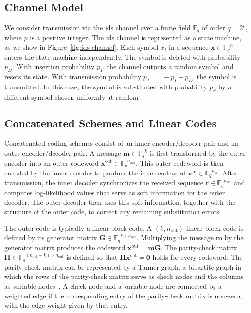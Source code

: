 \documentclass[conference,letterpaperu]{IEEEtran}
\newcommand{\pdel}{\ensuremath{p_D}}
\newcommand{\pins}{\ensuremath{p_I}}
\newcommand{\psub}{\ensuremath{p_S}}
\newcommand{\ptrans}{\ensuremath{p_T}}
\newcommand{\ygen}{\ensuremath{\bm{x}}}
\newcommand{\ygenIx}{\ensuremath{x}}
\newcommand{\yin}{\ensuremath{\bm{x}^{\text{in}}}}
\newcommand{\yout}{\ensuremath{\bm{x}^{\text{out}}}}
\newcommand{\mess}{\ensuremath{\bm{m}}}
\newcommand{\ngen}{\ensuremath{n}}
\newcommand{\nin}{\ensuremath{n_{\text{in}}}}
\newcommand{\nout}{\ensuremath{n_{\text{out}}}}
\newcommand{\rec}{\ensuremath{\bm{r}}}
\newcommand{\nrec}{\ensuremath{n_{\text{rec}}}}
\newcommand{\gen}{\ensuremath{\bm{G}}}
\newcommand{\pc}{\ensuremath{\bm{H}}}
\newcommand{\alphabet}{\ensuremath{\mathbb{F}_q}}
\begin{document}
\subsection{Channel Model}
We consider transmission via the \acl{ids} channel over a finite field $\alphabet$ of order $q = 2^p$, where $p$ is a positive integer. 
The \ac{ids} channel is represented as a state machine, as we show in Figure~\ref{fig:ids-channel}. Each symbol $\ygenIx_i$ in a sequence $\ygen \in \alphabet^\ngen$ enters the state machine independently. The symbol is deleted with probability $\pdel$. With insertion probability $\pins$, the channel outputs a random symbol and resets its state. With transmission probability $\ptrans = 1 - \pins - \pdel$, the symbol is transmitted. In this case, the symbol is substituted with probability $\psub$ by a different symbol chosen uniformly at random~\cite{daveyReliableCommunicationChannels2001}.

\subsection{Concatenated Schemes and Linear Codes}
\label{sec:linear_code}
Concatenated coding schemes consist of an inner encoder/decoder pair and an outer encoder/decoder pair. A message $\mess \in \alphabet^{k}$ is first transformed by the outer encoder into an outer codeword $\yout \in \alphabet^{\nout}$. This outer codeword is then encoded by the inner encoder to produce the inner codeword $\yin \in \alphabet^{\nin}$. After transmission, the inner decoder synchronizes the received sequence $\rec \in \alphabet^{\nrec}$ and computes log-likelihood values that serve as soft information for the outer decoder. The outer decoder then uses this soft information, together with the structure of the outer code, to correct any remaining substitution errors.

The outer code is typically a linear block code. A $(k, \nout)$ linear block code is defined by its generator matrix $\gen \in \alphabet^{k \times \nout}$. Multiplying the message $\mess$ by the generator matrix produces the codeword $\yout = \mess\gen$. The parity-check matrix \( \pc \in \alphabet^{(\nout-k) \times \nout} \) is defined so that $\pc \yout = \bm{0}$ holds for every codeword. The parity-check matrix can be represented by a Tanner graph, a bipartite graph in which the rows of the parity-check matrix serve as check nodes and the columns as variable nodes~\cite{tannerRecursiveApproachLow1981}. A check node and a variable node are connected by a weighted edge if the corresponding entry of the parity-check matrix is non-zero, with the edge weight given by that entry. 
\end{document}
